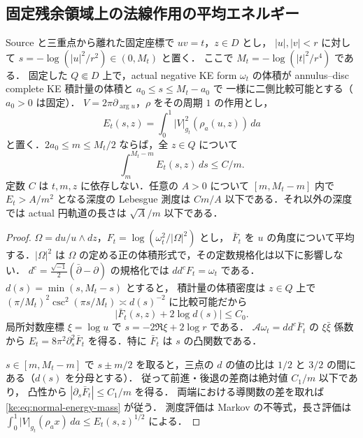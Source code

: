 \subsection{固定残余領域上の法線作用の平均エネルギー}

\begin{proposition}[法線方向の積分評価と短い円軌道]
\label{ke:neck-integrated-normal-energy}
Source と三重点から離れた固定座標で $uv=t$，$z\in D$ とし，
$|u|,|v|<r$ に対して $s=-\log(|u|^2/r^2)\in(0,M_t)$ と置く．
ここで $M_t=-\log(|t|^2/r^4)$ である．
固定した $Q\Subset D$ 上で，actual negative KE form $\omega_t$ の体積が
annulus--disc complete KE 積計量の体積と $a_0\le s\le M_t-a_0$ で
一様に二側比較可能とする（$a_0>0$ は固定）．
$V=2\pi\partial_{\arg u}$，$\rho$ をその周期 $1$ の作用とし，
\[
 E_t(s,z)=\int_0^1 |V|_{g_t}^2(\rho_a(u,z))\,da
\]
と置く．$2a_0\le m\le M_t/2$ ならば，全 $z\in Q$ について
\begin{equation}\label{ke:eq:normal-energy-mass}
 \int_m^{M_t-m} E_t(s,z)\,ds\le C/m .
\end{equation}
定数 $C$ は $t,m,z$ に依存しない．任意の $A>0$ について
$[m,M_t-m]$ 内で $E_t>A/m^2$ となる深度の Lebesgue 測度は
$Cm/A$ 以下である．それ以外の深度では actual 円軌道の長さは
$\sqrt A/m$ 以下である．
\end{proposition}

\begin{proof}
$\Omega=du/u\wedge dz$，$F_t=\log(\omega_t^2/|\Omega|^2)$ とし，
$\bar F_t$ を $u$ の角度について平均する．$|\Omega|^2$ は
$\Omega$ の定める正の体積形式で，その定数規格化は以下に影響しない．
$d^c=\tfrac{\sqrt{-1}}2(\bar\partial-\partial)$ の規格化では
$dd^cF_t=\omega_t$ である．$d(s)=\min(s,M_t-s)$ とすると，
積計量の体積密度は $z\in Q$ 上で
$(\pi/M_t)^2\csc^2(\pi s/M_t)\asymp d(s)^{-2}$ に比較可能だから
\[
 \bigl|\bar F_t(s,z)+2\log d(s)\bigr|\le C_0 .
\]
局所対数座標 $\xi=\log u$ で $s=-2\Re\xi+2\log r$ である．
$\mathcal A\omega_t=dd^c\bar F_t$ の $\xi\bar\xi$ 係数から
$E_t=8\pi^2\partial_s^2\bar F_t$ を得る．特に $\bar F_t$ は $s$ の凸関数である．

$s\in[m,M_t-m]$ で $s\pm m/2$ を取ると，三点の $d$ の値の比は
$1/2$ と $3/2$ の間にある（$d(s)$ を分母とする）．
従って前進・後退の差商は絶対値 $C_1/m$ 以下であり，
凸性から $|\partial_s\bar F_t|\le C_1/m$ を得る．
両端における導関数の差を取れば
\eqref{ke:eq:normal-energy-mass} が従う．
測度評価は Markov の不等式，長さ評価は
$\int_0^1 |V|_{g_t}(\rho_a x)\,da\le E_t(s,z)^{1/2}$ による．
\end{proof}

